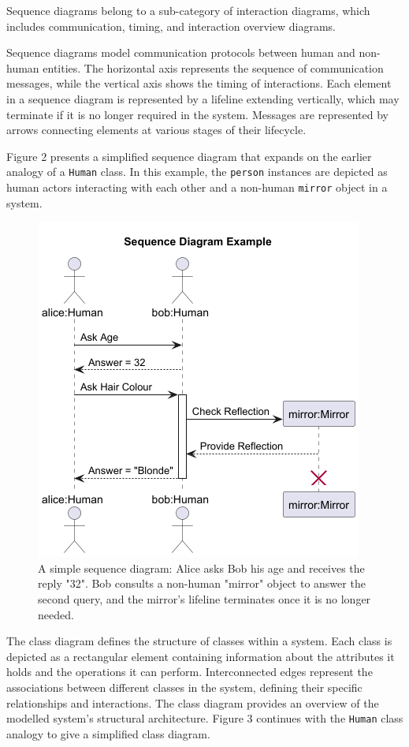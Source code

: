 \documentclass{article}
\newcounter{subsubsubsection}[subsubsection]
\begin{document}
{

Sequence diagrams belong to a sub-category of interaction diagrams, which includes communication, timing, and interaction overview diagrams\cite{Seidl_Scholz_Huemer_Kappel_Duffy_2014}.

Sequence diagrams model communication protocols between human and non-human entities. The horizontal axis represents the sequence of communication messages, while the vertical axis shows the timing of interactions. Each element in a sequence diagram is represented by a lifeline extending vertically, which may terminate if it is no longer required in the system. Messages are represented by arrows connecting elements at various stages of their lifecycle. 

Figure 2 presents a simplified sequence diagram that expands on the earlier analogy of a \texttt{Human} class. In this example, the \texttt{person} instances are depicted as human actors interacting with each other and a non-human \texttt{mirror} object in a system.

\begin{figure}[H]
    \centering
\includegraphics[width=0.7\linewidth]{SDexample-Sequence_Diagram_Example.png}
    \caption{A simple sequence diagram: Alice asks Bob his age and receives the reply "32". Bob consults a non-human "mirror" object to answer the second query, and the mirror's lifeline terminates once it is no longer needed.}
    \label{fig:Simple SD}
\end{figure}


The class diagram defines the structure of classes within a system\cite{Seidl_Scholz_Huemer_Kappel_Duffy_2014}. Each class is depicted as a rectangular element containing information about the attributes it holds and the operations it can perform. Interconnected edges represent the associations between different classes in the system, defining their specific relationships and interactions. The class diagram provides an overview of the modelled system's structural architecture. Figure 3 continues with the \texttt{Human} class analogy to give a simplified class diagram.

}
\end{document}
